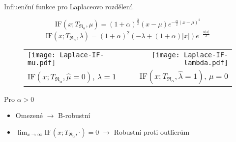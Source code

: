 \documentclass[11pt,a4paper]{beamer}
\begin{document}
\begin{frame}{Influenční funkce pro Laplaceovo rozdělení.}

{\footnotesize\[\mathrm{IF}(x;T_{\mathfrak{R}_\alpha},\mu) = (1+\alpha )^{\frac{3}{2}} (x-\mu )  e^{-\frac{\alpha}{2} (x-\mu )^2}\]}
{\footnotesize\[\mathrm{IF}(x;T_{\mathfrak{R}_\alpha},\lambda) = (1 + \alpha)^2 \left(-\lambda + (1 + \alpha)|x|\right)  e^{-\frac{\alpha|x|}{\lambda}}\]}
\vspace*{-0.3in}	
\begin{figure}[htb]
\begin{tabular}{lr}
	\texttt{[image: Laplace-IF-mu.pdf]}
	&
	\texttt{[image: Laplace-IF-lambda.pdf]}
	\\
	{\footnotesize $\mathrm{IF}(x;T_{\mathfrak{R}_\alpha},\widehat{\mu} = 0) $, $\lambda = 1$}
	&
	{\footnotesize $\mathrm{IF}(x;T_{\mathfrak{R}_\alpha},\widehat{\lambda} = 1)$, $\mu = 0$}
	\\
\end{tabular}
\end{figure}
\vspace*{-0.1in}	
{\footnotesize Pro $\alpha> 0$}
\begin{itemize}
	\item {\footnotesize Omezené $\rightarrow$ B-robustní}
	\item {\footnotesize$\lim_{x\rightarrow \infty} \mathrm{IF}(x;T_{\mathfrak{R}_\alpha},\cdot) = 0 \; \rightarrow$ Robustní proti outlierům}
\end{itemize}


\end{frame}
\end{document}
